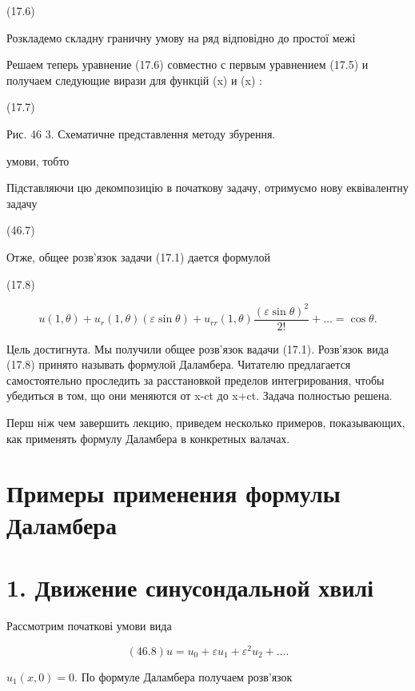 \documentclass[
  ukrainian,
]{article}
\begin{document}
(17.6)

Розкладемо складну граничну умову на ряд відповідно до простої межі

Решаем теперь уравнение (17.6) совместно с первым уравнением (17.5) и
получаем следующие вирази для функцій \varphi(x) и \psi(x) :

(17.7)

Рис. 46 3. Схематичне представлення методу збурення.

умови, тобто

Підставляючи цю декомпозицію в початкову задачу, отримуємо нову
еквівалентну задачу

(46.7)

Отже, общее розв'язок задачи (17.1) дается формулой

(17.8)

\[
u(1, \theta) + u_r(1, \theta) (\varepsilon \sin \theta) + u_{rr}(1, \theta) \frac{(\varepsilon \sin \theta)^2}{2!} + \dots = \cos \theta.
\]

Цель достигнута. Мы получили общее розв'язок вадачи (17.1). Розв'язок
вида (17.8) принято называть формулой Даламбера. Читателю предлагается
самостоятельно проследить за расстановкой пределов интегрирования, чтобы
убедиться в том, що они меняются от x-ct до x+ct. Задача полностью
решена.

Перш ніж чем завершить лекцию, приведем несколько примеров,
показывающих, как применять формулу Даламбера в конкретных валачах.

\section{Примеры применения формулы
Даламбера}\label{ux43fux440ux438ux43cux435ux440ux44b-ux43fux440ux438ux43cux435ux43dux435ux43dux438ux44f-ux444ux43eux440ux43cux443ux43bux44b-ux434ux430ux43bux430ux43cux431ux435ux440ux430}

\section{1. Движение синусондальной
хвилі}\label{ux434ux432ux438ux436ux435ux43dux438ux435-ux441ux438ux43dux443ux441ux43eux43dux434ux430ux43bux44cux43dux43eux439-ux445ux432ux438ux43bux456}

Рассмотрим початкові умови вида

\[
(46.8) u = u_0 + \varepsilon u_1 + \varepsilon^2 u_2 + \dots.
\]

\(u_1(x, 0) = 0.\) По формуле Даламбера получаем розв'язок
\end{document}
